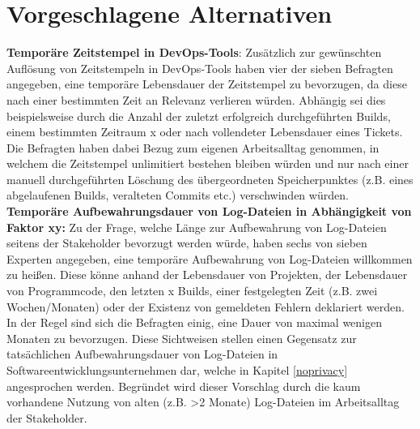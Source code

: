 \section{Vorgeschlagene Alternativen} \label{alternatives}
\textbf{Temporäre Zeitstempel in DevOps-Tools}: \newline
Zusätzlich zur gewünschten Auflösung von Zeitstempeln in DevOps-Tools haben vier der sieben Befragten angegeben, eine temporäre Lebensdauer der Zeitstempel zu bevorzugen, da diese nach einer bestimmten Zeit an Relevanz verlieren würden. Abhängig sei dies beispielsweise durch die Anzahl der zuletzt erfolgreich durchgeführten Builds, einem bestimmten Zeitraum x oder nach vollendeter Lebensdauer eines Tickets. 
Die Befragten haben dabei Bezug zum eigenen Arbeitsalltag genommen, in welchem die Zeitstempel unlimitiert bestehen bleiben würden und nur nach einer manuell durchgeführten Löschung des übergeordneten Speicherpunktes (z.B. eines abgelaufenen Builds, veralteten Commits etc.) verschwinden würden. \newline \newline
\textbf{Temporäre Aufbewahrungsdauer von Log-Dateien in Abhängigkeit von Faktor xy:}
Zu der Frage, welche Länge zur Aufbewahrung von Log-Dateien seitens der Stakeholder bevorzugt werden würde, haben sechs von sieben Experten angegeben, eine temporäre Aufbewahrung von Log-Dateien willkommen zu heißen. Diese könne anhand der Lebensdauer von Projekten, der Lebensdauer von Programmcode, den letzten x Builds, einer festgelegten Zeit (z.B. zwei Wochen/Monaten)
oder der Existenz von gemeldeten Fehlern deklariert werden. In der Regel sind sich die Befragten einig, eine Dauer von maximal wenigen Monaten zu bevorzugen. Diese Sichtweisen stellen einen Gegensatz zur tatsächlichen Aufbewahrungsdauer von Log-Dateien in Softwareentwicklungsunternehmen dar, welche in Kapitel \ref{noprivacy} angesprochen werden. Begründet wird dieser Vorschlag
durch die kaum vorhandene Nutzung von alten (z.B. >2 Monate) Log-Dateien im Arbeitsalltag der Stakeholder.

